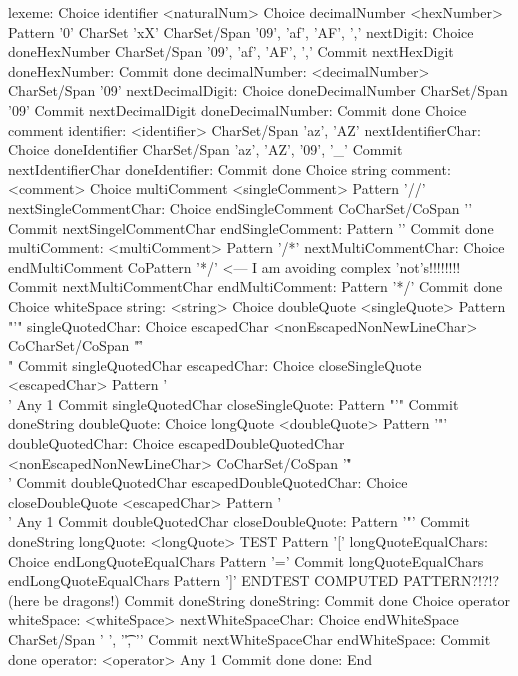 \starttyping
lexeme:
  Choice identifier
    <naturalNum>
    Choice decimalNumber
      <hexNumber>
      Pattern '0'
      CharSet 'xX'
      CharSet/Span {'09', 'af', 'AF', ','}
    nextDigit:
      Choice doneHexNumber
      CharSet/Span {'09', 'af', 'AF', ','}
      Commit nextHexDigit
    doneHexNumber:
    Commit done
  decimalNumber:
      <decimalNumber>
      CharSet/Span '09'
    nextDecimalDigit:
      Choice doneDecimalNumber
      CharSet/Span '09'
      Commit nextDecimalDigit
    doneDecimalNumber:
    Commit done
  Choice comment
identifier:
    <identifier>
    CharSet/Span {'az', 'AZ'}
  nextIdentifierChar:
    Choice doneIdentifier
      CharSet/Span {'az', 'AZ', '09', '_'}
      Commit nextIdentifierChar
  doneIdentifier:
    Commit done
  Choice string
comment:
    <comment>
    Choice multiComment
      <singleComment>
      Pattern '//'
    nextSingleCommentChar:
      Choice endSingleComment
      CoCharSet/CoSpan '\n'
      Commit nextSingelCommentChar
    endSingleComment:
      Pattern '\n'
      Commit done
    multiComment:
      <multiComment>
      Pattern '/*'
    nextMultiCommentChar:
      Choice endMultiComment
      CoPattern '*/'                <--- I am avoiding complex 'not's!!!!!!!!
      Commit nextMultiCommentChar
    endMultiComment:
      Pattern '*/'
      Commit done
  Choice whiteSpace
string:
    <string>
    Choice doubleQuote
      <singleQuote>
      Pattern "'"
    singleQuotedChar:
      Choice escapedChar
        <nonEscapedNonNewLineChar>
        CoCharSet/CoSpan "'\r\n\f\\"
        Commit singleQuotedChar
      escapedChar:
        Choice closeSingleQuote
        <escapedChar>
        Pattern '\\'
        Any 1
        Commit singleQuotedChar
      closeSingleQuote:
        Pattern "'"
      Commit doneString
    doubleQuote:
    Choice longQuote
      <doubleQuote>
      Pattern '"'
    doubleQuotedChar:
      Choice escapedDoubleQuotedChar
        <nonEscapedNonNewLineChar>
        CoCharSet/CoSpan '"\r\n\f\\'
        Commit doubleQuotedChar
      escapedDoubleQuotedChar:
        Choice closeDoubleQuote
        <escapedChar>
        Pattern '\\'
        Any 1
        Commit doubleQuotedChar
      closeDoubleQuote:
        Pattern '"'
      Commit doneString
    longQuote:
      <longQuote>
      TEST
        Pattern '['
        longQuoteEqualChars:
          Choice endLongQuoteEqualChars
            Pattern '='
            Commit longQuoteEqualChars
        endLongQuoteEqualChars
        Pattern ']'
      ENDTEST
      COMPUTED PATTERN?!?!? (here be dragons!)
      Commit doneString
  doneString:
    Commit done
  Choice operator
whiteSpace:
    <whiteSpace>
  nextWhiteSpaceChar:
    Choice endWhiteSpace
    CharSet/Span {' ', '\t', '\n'}
    Commit nextWhiteSpaceChar
  endWhiteSpace:
    Commit done
operator:
    <operator>
    Any 1
    Commit done
done:
  End
\stoptyping

